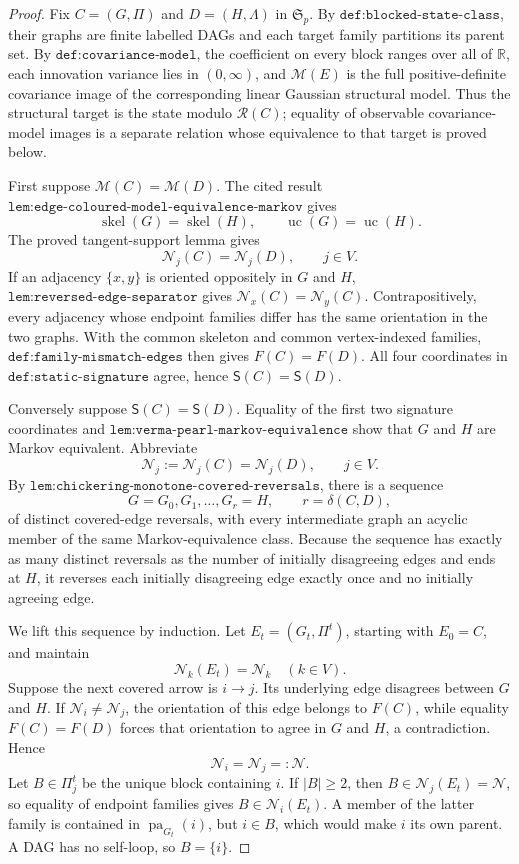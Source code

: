 \documentclass{article}
\begin{document}
\begin{proof}
Fix \(C=(G,\Pi)\) and \(D=(H,\Lambda)\) in \(\mathfrak S_p\). By \(\texttt{def:blocked-state-class}\), their graphs are finite labelled DAGs and each target family partitions its parent set. By \(\texttt{def:covariance-model}\), the coefficient on every block ranges over all of \(\mathbb R\), each innovation variance lies in \((0,\infty)\), and \(\mathcal M(E)\) is the full positive-definite covariance image of the corresponding linear Gaussian structural model. Thus the structural target is the state modulo \(\mathcal R(C)\); equality of observable covariance-model images is a separate relation whose equivalence to that target is proved below.

First suppose \(\mathcal M(C)=\mathcal M(D)\). The cited result \(\texttt{lem:edge-coloured-model-equivalence-markov}\) gives
\[
 \operatorname{skel}(G)=\operatorname{skel}(H),
 \qquad
 \operatorname{uc}(G)=\operatorname{uc}(H).
\]
The proved tangent-support lemma gives
\[
 \mathcal N_j(C)=\mathcal N_j(D),\qquad j\in V.
\]
If an adjacency \(\{x,y\}\) is oriented oppositely in \(G\) and \(H\), \(\texttt{lem:reversed-edge-separator}\) gives \(\mathcal N_x(C)=\mathcal N_y(C)\). Contrapositively, every adjacency whose endpoint families differ has the same orientation in the two graphs. With the common skeleton and common vertex-indexed families, \(\texttt{def:family-mismatch-edges}\) then gives \(F(C)=F(D)\). All four coordinates in \(\texttt{def:static-signature}\) agree, hence \(\mathsf S(C)=\mathsf S(D)\).

Conversely suppose \(\mathsf S(C)=\mathsf S(D)\). Equality of the first two signature coordinates and \(\texttt{lem:verma-pearl-markov-equivalence}\) show that \(G\) and \(H\) are Markov equivalent. Abbreviate
\[
 \mathcal N_j:=\mathcal N_j(C)=\mathcal N_j(D),\qquad j\in V.
\]
By \(\texttt{lem:chickering-monotone-covered-reversals}\), there is a sequence
\[
 G=G_0,G_1,\ldots,G_r=H,
 \qquad r=\delta(C,D),
\]
of distinct covered-edge reversals, with every intermediate graph an acyclic member of the same Markov-equivalence class. Because the sequence has exactly as many distinct reversals as the number of initially disagreeing edges and ends at \(H\), it reverses each initially disagreeing edge exactly once and no initially agreeing edge.

We lift this sequence by induction. Let \(E_t=(G_t,\Pi^t)\), starting with \(E_0=C\), and maintain
\[
 \mathcal N_k(E_t)=\mathcal N_k\quad(k\in V).
\]
Suppose the next covered arrow is \(i\to j\). Its underlying edge disagrees between \(G\) and \(H\). If \(\mathcal N_i\neq\mathcal N_j\), the orientation of this edge belongs to \(F(C)\), while equality \(F(C)=F(D)\) forces that orientation to agree in \(G\) and \(H\), a contradiction. Hence
\[
 \mathcal N_i=\mathcal N_j=:\mathcal N.
\]
Let \(B\in\Pi^t_j\) be the unique block containing \(i\). If \(|B|\geq2\), then \(B\in\mathcal N_j(E_t)=\mathcal N\), so equality of endpoint families gives \(B\in\mathcal N_i(E_t)\). A member of the latter family is contained in \(\operatorname{pa}_{G_t}(i)\), but \(i\in B\), which would make \(i\) its own parent. A DAG has no self-loop, so \(B=\{i\}\).


\end{proof}
\end{document}
